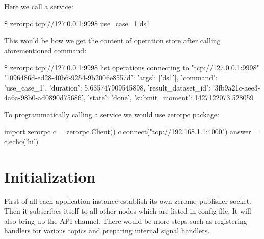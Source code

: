 Here we call a service:
\begin{python}
\$ zerorpc tcp://127.0.0.1:9998 use_case_1 ds1
\end{python}

This would be how we get the content of operation store after calling aforementioned command:

\begin{python}
\$ zerorpc tcp://127.0.0.1:9998 list operations
connecting to "tcp://127.0.0.1:9998"
{'1096486d-ed28-40b6-9254-9b2006e8557d': {'args': ['ds1'],
                                          'command': 'use_case_1',
                                          'duration': 5.635747909545898,
                                          'result_dataset_id': '3fb9a21c-aee3-4a6a-98b0-ad0890d75686',
                                          'state': 'done',
                                          'submit_moment': 1427122073.528059}}
\end{python}

To programmatically calling a service we would use zerorpc package:

\begin{python}
import zerorpc
c = zerorpc.Client()
c.connect("tcp://192.168.1.1:4000")
answer = c.echo('hi')
\end{python}


\section{Initialization}
First of all each application instance establish its own zeromq publisher socket. Then it subscribes
itself to all other nodes which are listed in config file. It will also bring up the API channel.
There would be more steps such as registering handlers for various topics and preparing internal
signal handlers.
